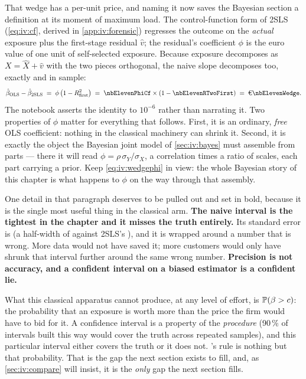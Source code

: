 That wedge has a per-unit price, and naming it now saves the Bayesian section a definition at
its moment of maximum load. The control-function form of 2SLS (\cref{eq:iv:cf}, derived in
\cref{app:iv:forensic}) regresses the outcome on the \emph{actual} exposure plus the
first-stage residual $\hat v$; the residual's coefficient $\phi$ is the euro value of one
unit of self-selected exposure. Because exposure decomposes as $X = \hat X + \hat v$ with the
two pieces orthogonal, the naive slope decomposes too, exactly and in sample:
%
\begin{equation}
  \hat\beta_{\text{OLS}} - \hat\beta_{\text{2SLS}}
  \;=\; \phi\,\big(1 - R^{2}_{\text{first}}\big)
  \;=\; \nbElevenPhiCf \times (1 - \nbElevenRTwoFirst)
  \;=\; \eur{\nbElevenWedge}.
  \label{eq:iv:wedgephi}
\end{equation}
%
The notebook asserts the identity to $10^{-6}$ rather than narrating it. Two properties of
$\phi$ matter for everything that follows. First, it is an ordinary, \emph{free} OLS
coefficient: nothing in the classical machinery can shrink it. Second, it is exactly the
object the Bayesian joint model of \cref{sec:iv:bayes} must assemble from parts --- there it
will read $\phi = \rho\,\sigma_Y/\sigma_X$, a correlation times a ratio of scales, each part
carrying a prior. Keep \cref{eq:iv:wedgephi} in view: the whole Bayesian story of this chapter
is what happens to $\phi$ on the way through that assembly.

One detail in that paragraph deserves to be pulled out and set in bold, because it is the single
most useful thing in the classical arm. \textbf{The naive interval is the tightest in the chapter
and it misses the truth entirely.} Its standard error is \eur{\nbElevenNaiveSe} (a half-width of
\eur{\nbElevenNaiveHalf} against 2SLS's \eur{\nbElevenIvHalf}), and it is wrapped around a number
that is \eur{\nbElevenNaiveErr} wrong. More data would not have saved it; more customers would only
have shrunk that interval further around the same wrong number. \textbf{Precision is not accuracy,
and a confident interval on a biased estimator is a confident lie.}

What this classical apparatus cannot produce, at any level of effort, is $\operatorname{\mathbb{P}}(\beta > c)$: the
probability that an exposure is worth more than the price the firm would have to bid for it. A
confidence interval is a property of the \emph{procedure} (90\,\% of intervals built this way
would cover the truth across repeated samples), and this particular interval either covers the
truth or it does not. 's rule is nothing but that probability. That is the gap the
next section exists to fill, and, as \cref{sec:iv:compare} will insist, it is the \emph{only} gap
the next section fills.

